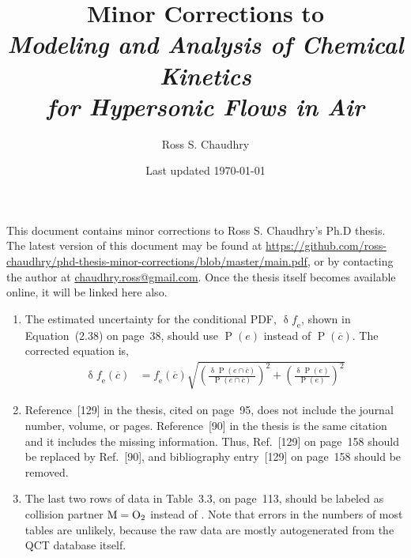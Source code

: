 \documentclass[11 pt]{article}
\title{Minor Corrections to \\
   \emph{Modeling and Analysis of Chemical Kinetics \\
         for Hypersonic Flows in Air} }
\author{Ross S. Chaudhry}
\date{Last updated \today}
\newcommand{\ol}{\overline}
\newcommand\myP{\operatorname{P}}
\newcommand\myerror{\operatorname{\delta}}
\newcommand\fe{\operatorname{\mathit{f}_e}}
\begin{document}
\maketitle

\noindent
This document contains minor corrections to Ross S. Chaudhry's Ph.D thesis.
The latest version of this document may be found at \url{https://github.com/ross-chaudhry/phd-thesis-minor-corrections/blob/master/main.pdf},
   or by contacting the author at \href{mailto:chaudhry.ross@gmail.com}{chaudhry.ross@gmail.com}.
Once the thesis itself becomes available online, it will be linked here also.


\begin{enumerate}

\item
The estimated uncertainty for the conditional PDF, $\myerror\fe$,
   shown in Equation~(2.38) on page~38, should use $\myP\left(e\right)$
   instead of $\myP\left(\ol{c}\right)$.
The corrected equation is,
%
\begin{align*}
   \myerror \fe\left(\ol{c}\right) &= \fe\left(\ol{c}\right) \sqrt{ \left(\frac{\myerror \myP\left(e \cap \ol{c}\right)}{\myP\left(e \cap \ol{c}\right)}\right)^2
                                                                  + \left(\frac{\myerror \myP\left(           e \right)}{\myP\left(           e \right)}\right)^2 }
\end{align*}

\item
Reference~[129] in the thesis, cited on page~95,
   does not include the journal number, volume, or pages.
Reference~[90] in the thesis is the same citation and it includes the missing information.
Thus, Ref.~[129] on page~158 should be replaced by Ref.~[90],
   and bibliography entry~[129] on page~158 should be removed.

\item
The last two rows of data in Table~3.3, on page~113, should be labeled as collision partner $\ce{M}=\ce{O2}$
   instead of .
Note that errors in the numbers of most tables are unlikely,
   because the raw data are mostly autogenerated from the QCT database itself.

% 

\end{enumerate}
\end{document}
